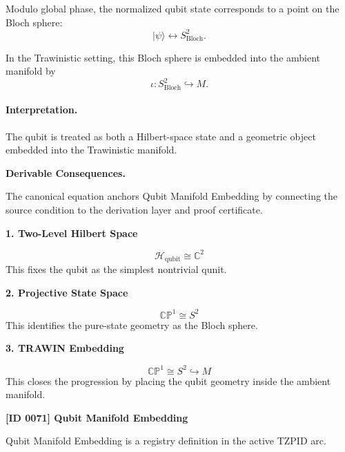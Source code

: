 Modulo global phase, the normalized qubit state corresponds to a point on the Bloch sphere:
\begin{equation}
|\psi\rangle \longleftrightarrow S^2_{\mathrm{Bloch}} .
\end{equation}

In the Trawinistic setting, this Bloch sphere is embedded into the ambient manifold by
\begin{equation}
\boxed{
\iota:S^2_{\mathrm{Bloch}}\hookrightarrow M .
}
\end{equation}

\paragraph{Interpretation.}
The qubit is treated as both a Hilbert-space state and a geometric object embedded into the Trawinistic manifold.

\par\vspace{0.35em}
\noindent\textbf{Derivable Consequences.}\quad
\begingroup
\footnotesize
\raggedright
The canonical equation anchors Qubit Manifold Embedding by connecting the source condition to the derivation layer and proof certificate.
\par\endgroup

\noindent\textbf{1. Two-Level Hilbert Space}\par
\[
\mathcal{H}_{\mathrm{qubit}} \cong \mathbb{C}^{2}
\]
\noindent This fixes the qubit as the simplest nontrivial qunit.\par
\noindent\textbf{2. Projective State Space}\par
\[
\mathbb{CP}^{1} \cong S^{2}
\]
\noindent This identifies the pure-state geometry as the Bloch sphere.\par
\noindent\textbf{3. TRAWIN Embedding}\par
\[
\mathbb{CP}^{1} \cong S^{2} \hookrightarrow M
\]
\noindent This closes the progression by placing the qubit geometry inside the ambient manifold.\par

\clearpage
\noindent\textbf{[ID 0071] Qubit Manifold Embedding}\par
\vspace{0.35em}
\begingroup\small
{}
Qubit Manifold Embedding is a registry definition in the active TZPID arc.

